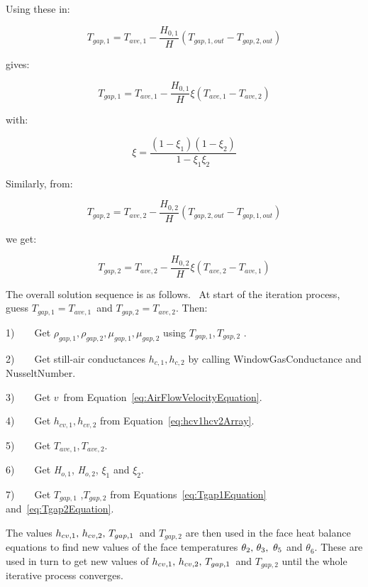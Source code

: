 Using these in:

\begin{equation}
{T_{gap,1}} = {T_{ave,1}} - \frac{{{H_{0,1}}}}{H}\left( {{T_{gap,1,out}} - {T_{gap,2,out}}} \right)
\end{equation}

gives:

\begin{equation}
{T_{gap,1}} = {T_{ave,1}} - \frac{{{H_{0,1}}}}{H}\xi \left( {{T_{ave,1}} - {T_{ave,2}}} \right)
\label{eq:Tgap1Equation}
\end{equation}

with:

\begin{equation}
\xi  = \frac{{(1 - {\xi_1})(1 - {\xi_2})}}{{1 - {\xi_1}{\xi_2}}}
\end{equation}

Similarly, from:

\begin{equation}
{T_{gap,2}} = {T_{ave,2}} - \frac{{{H_{0,2}}}}{H}\left( {{T_{gap,2,out}} - {T_{gap,1,out}}} \right)
\end{equation}

we get:

\begin{equation}
{T_{gap,2}} = {T_{ave,2}} - \frac{{{H_{0,2}}}}{H}\xi \left( {{T_{ave,2}} - {T_{ave,1}}} \right)
\label{eq:Tgap2Equation}
\end{equation}

The overall solution sequence is as follows.~ At start of the iteration process, guess \({T_{gap,1}} = {T_{ave,1}}\)~and \({T_{gap,2}} = {T_{ave,2}}\). Then:

1)~~~~Get \({\rho_{gap,1}},{\rho_{gap,2}},{\mu_{gap,1}},{\mu_{gap,2}}\) using \({T_{gap,1}},{T_{gap,2}}\) .

2)~~~~Get still-air conductances \({h_{c,1}},{h_{c,2}}\) by calling WindowGasConductance and NusseltNumber.

3)~~~~Get \(v\)~from Equation~\ref{eq:AirFlowVelocityEquation}.

4)~~~~Get \({h_{cv,1}},{h_{cv,2}}\) from Equation~\ref{eq:hcv1hcv2Array}.

5)~~~~Get \({T_{ave,1}},{T_{ave,2}}\).

6)~~~~Get \emph{H\(_{o,1}\)}, \emph{H\(_{o,2}\)}, \({\xi_1}\) and \({\xi_2}\).

7)~~~~Get \({T_{gap,1}}\) ,\({T_{gap,2}}\) from Equations~\ref{eq:Tgap1Equation} and~\ref{eq:Tgap2Equation}.

The values \({h_{cv,1}}{\rm{,~}}{h_{cv,2}}{\rm{,~}}{T_{gap,1}}\)~and \({T_{gap,2}}\) are then used in the face heat balance equations to find new values of the face temperatures \({\theta_2}{\rm{,~}}{\theta_3},{\rm{~}}{\theta_5}\) and \({\theta_6}\). These are used in turn to get new values of \({h_{cv,1}}{\rm{,~}}{h_{cv,2}}{\rm{,~}}{T_{gap,1}}\)~and \({T_{gap,2}}\) until the whole iterative process converges.

